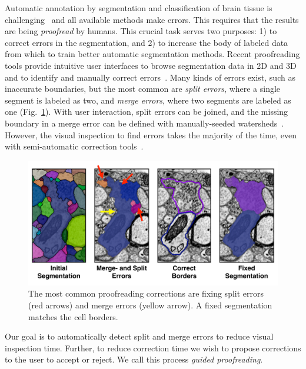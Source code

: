 Automatic annotation by segmentation and classification of brain tissue is
challenging~\cite{isbi_challenge} and all available methods make errors. This
requires that the results are being \emph{proofread} by humans. This crucial
task serves two purposes: 1) to correct errors in the segmentation, and 2) to
increase the body of labeled data from which to train better automatic
segmentation methods. Recent proofreading tools provide intuitive user
interfaces to browse segmentation data in 2D and 3D and to identify and manually
correct errors~\cite{markus_proofreading,raveler,mojo2,haehn_dojo_2014}. Many
kinds of errors exist, such as inaccurate boundaries, but the most common are
\emph{split errors}, where a single segment is labeled as two, and \emph{merge
errors}, where two segments are labeled as one
(Fig.~\ref{fig:merge_and_slit_errors}). With user interaction, split errors can
be joined, and the missing boundary in a merge error can be defined with
manually-seeded watersheds~\cite{haehn_dojo_2014}. However, the visual
inspection to find errors takes the majority of the time, even with
semi-automatic correction tools~\cite{proofreading_bottleneck}.

\begin{figure}[t]
\begin{center}
  \includegraphics[width=\linewidth]{gfx/merge_and_split_errors.pdf}
\end{center}
\vspace{-4mm}
   \caption{The most common proofreading corrections are fixing split errors (red arrows) and merge errors (yellow arrow). A fixed segmentation matches the cell borders.}
\label{fig:merge_and_slit_errors}
\end{figure}

Our goal is to automatically detect split and merge errors to reduce visual
inspection time. Further, to reduce correction time we wish to propose
corrections to the user to accept or reject. We call this process \textit{guided
proofreading}.

